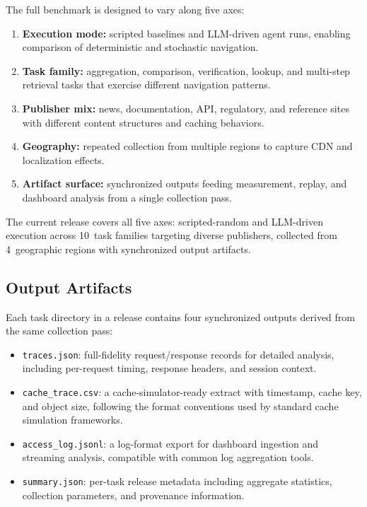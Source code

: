 \documentclass[10pt,sigconf,letterpaper,anonymous,nonacm]{acmart}
\begin{document}
The full benchmark is designed to vary along five axes:
\begin{enumerate}
\item \textbf{Execution mode:} scripted baselines and LLM-driven agent
  runs, enabling comparison of deterministic and stochastic navigation.
\item \textbf{Task family:} aggregation, comparison, verification,
  lookup, and multi-step retrieval tasks that exercise different
  navigation patterns.
\item \textbf{Publisher mix:} news, documentation, API, regulatory, and
  reference sites with different content structures and caching
  behaviors.
\item \textbf{Geography:} repeated collection from multiple regions to
  capture CDN and localization effects.
\item \textbf{Artifact surface:} synchronized outputs feeding
  measurement, replay, and dashboard analysis from a single collection
  pass.
\end{enumerate}

The current release covers all five axes: scripted-random and
LLM-driven execution across 10~task families targeting diverse
publishers, collected from 4~geographic regions with synchronized
output artifacts.

\subsection{Output Artifacts}

Each task directory in a release contains four synchronized outputs
derived from the same collection pass:
\begin{itemize}
\item \texttt{traces.json}: full-fidelity request/response records
  for detailed analysis, including per-request timing, response
  headers, and session context.
\item \texttt{cache\_trace.csv}: a cache-simulator-ready extract
  with timestamp, cache key, and object size, following the format
  conventions used by standard cache simulation frameworks.
\item \texttt{access\_log.jsonl}: a log-format export for dashboard
  ingestion and streaming analysis, compatible with common log
  aggregation tools.
\item \texttt{summary.json}: per-task release metadata including
  aggregate statistics, collection parameters, and provenance
  information.
\end{itemize}
\end{document}
